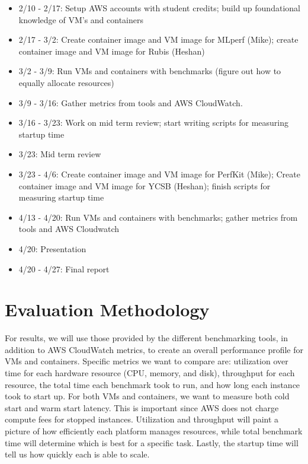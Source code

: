 \documentclass[11pt]{article}
\begin{document}
\begin{itemize}
\itemsep-2pt

\item 2/10 - 2/17: Setup AWS accounts with student credits; build up foundational knowledge of VM's and containers

\item 2/17 - 3/2: Create container image and VM image for MLperf (Mike); create container image and VM image for Rubis (Heshan)

\item 3/2 - 3/9: Run VMs and containers with benchmarks (figure out how to equally allocate resources)

\item 3/9 - 3/16: Gather metrics from tools and AWS CloudWatch.

\item 3/16 - 3/23: Work on mid term review; start writing scripts for measuring startup time

\item 3/23: Mid term review

\item 3/23 - 4/6: Create container image and VM image for PerfKit (Mike); Create container image and VM image for YCSB (Heshan); finish scripts for measuring startup time

\item 4/13 - 4/20: Run VMs and containers with benchmarks; gather metrics from tools and AWS Cloudwatch

\item 4/20: Presentation

\item 4/20 - 4/27: Final report

\end{itemize}

\section{Evaluation Methodology}

For results, we will use those provided by the different benchmarking tools, in addition to AWS CloudWatch metrics, to create an overall performance profile for VMs and containers. Specific metrics we want to compare are: utilization over time for each hardware resource (CPU, memory, and disk), throughput for each resource, the total time each benchmark took to run, and how long each instance took to start up. For both VMs and containers, we want to measure both cold start and warm start latency. This is important since AWS does not charge compute fees for stopped instances. Utilization and throughput will paint a picture of how efficiently each platform manages resources, while total benchmark time will determine which is best for a specific task. Lastly, the startup time will tell us how quickly each is able to scale.
\end{document}
